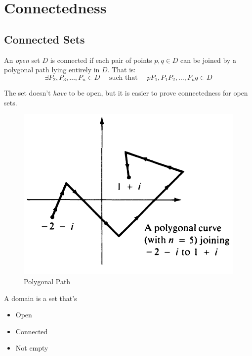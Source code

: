 \chapter{Connectedness}
\section{Connected Sets}
\begin{definition}
    An \textit{open} set $D$ is connected if each pair of points $p, q \in D$ can be joined by a polygonal path lying entirely in $D$. That is:
    \[
        \exists P_2, P_3, \ldots, P_n \in D\quad  \text{ such that }\quad  pP_1, P_1P_2, \ldots, P_nq \in D\]
\end{definition}

\begin{remark}
    The set doesn't \textit{have} to be open, but it is easier to prove connectedness for open sets.
\end{remark}

\begin{figure}[H]
    \centering
    \includegraphics[scale=0.5]{LECTURE_2/poly.png}
    \caption{Polygonal Path}
    \label{fig:poly}
\end{figure}

\begin{definition}
    [Domain]
    A domain is a set that's
    \begin{itemize}
        \item Open
        \item Connected
        \item Not empty
    \end{itemize}
\end{definition}

